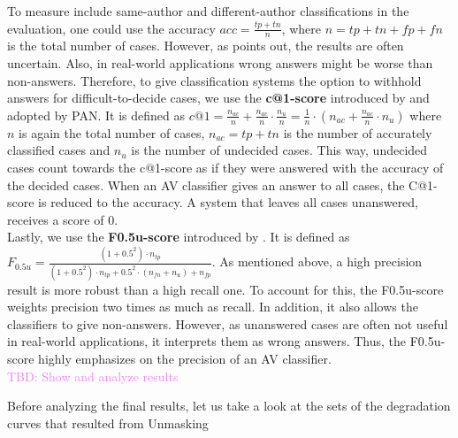 To measure include same-author and different-author classifications in the evaluation, one could use the accuracy $acc = \frac{tp+tn}{n}$, where $n = tp+tn+fp+fn$ is the total number of cases.
However, as \cite{bevendorff2019unmaskingShortTexts} points out, the results are often uncertain.
Also, in real-world applications wrong answers might be worse than non-answers.
Therefore, to give classification systems the option to withhold answers for difficult-to-decide cases, we use the \textbf{c@1-score} introduced by \cite{penas2011c_at_1} and adopted by PAN.
It is defined as $c@1 = \frac{n_{ac}}{n}+\frac{n_{ac}}{n}\cdot{}\frac{n_u}{n} = \frac{1}{n}\cdot{}\left(n_{ac}+\frac{n_{ac}}{n}\cdot{}n_u\right)$ where $n$ is again the total number of cases, $n_{ac} = tp+tn$ is the number of accurately classified cases and $n_u$ is the number of undecided cases.
This way, undecided cases count towards the c@1-score as if they were answered with the accuracy of the decided cases.
When an AV classifier gives an answer to all cases, the C@1-score is reduced to the accuracy.
A system that leaves all cases unanswered, receives a score of 0.\\
Lastly, we use the \textbf{F0.5u-score} introduced by \cite{bevendorff2019unmaskingShortTexts}.
It is defined as $F_{0.5u} = \frac{(1+0.5^2)\cdot{}n_{tp}}{(1+0.5^2)\cdot{}n_{tp}+0.5^2\cdot{}(n_{fn}+n_u)+n_{fp}}$.
As mentioned above, a high precision result is more robust than a high recall one.
To account for this, the F0.5u-score weights precision two times as much as recall.
In addition, it also allows the classifiers to give non-answers.
However, as unanswered cases are often not useful in real-world applications, it interprets them as wrong answers.
Thus, the F0.5u-score highly emphasizes on the precision of an AV classifier.\\

\textcolor{violet}{
TBD: Show and analyze results\\
}

Before analyzing the final results, let us take a look at the sets of the degradation curves that resulted from Unmasking


